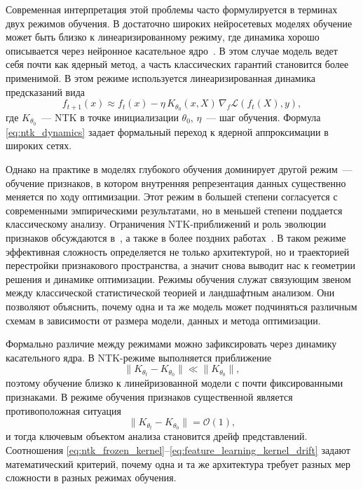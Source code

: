 Современная интерпретация этой проблемы часто формулируется в терминах двух режимов обучения.
В достаточно широких нейросетевых моделях обучение может быть близко к линеаризированному режиму, где динамика хорошо описывается через нейронное касательное ядро~\cite{jacot2018neural,adlam2020ntkhighdim,uniform2021ntk}.
В этом случае модель ведет себя почти как ядерный метод, а часть классических гарантий становится более применимой.
В этом режиме используется линеаризированная динамика предсказаний вида
\begin{equation}
f_{t+1}(x)\approx f_t(x)-\eta\,K_{\theta_0}(x,X)\,\nabla_f\mathcal L\!\left(f_t(X),y\right),
\label{eq:ntk_dynamics}
\end{equation}
где $K_{\theta_0}$~--- NTK в точке инициализации $\theta_0$, $\eta$~--- шаг обучения.
Формула \eqref{eq:ntk_dynamics} задает формальный переход к ядерной аппроксимации в широких сетях.

Однако на практике в моделях глубокого обучения доминирует другой режим~--- обучение признаков, в котором внутренняя репрезентация данных существенно меняется по ходу оптимизации.
Этот режим в большей степени согласуется с современными эмпирическими результатами, но в меньшей степени поддается классическому анализу. Ограничения NTK-приближений и роль эволюции признаков обсуждаются в~\cite{arora2019finegrained,featurevskernel2020}, а также в более поздних работах~\cite{leaveoneout2022,seleznova2022ntklimits}.
В таком режиме эффективная сложность определяется не только архитектурой, но и траекторией перестройки признакового пространства, а значит снова выводит нас к геометрии решения и динамике оптимизации.
Режимы обучения служат связующим звеном между классической статистической теорией и ландшафтным анализом.
Они позволяют объяснить, почему одна и та же модель может подчиняться различным схемам в зависимости от размера модели, данных и метода оптимизации.

Формально различие между режимами можно зафиксировать через динамику касательного ядра. В NTK-режиме выполняется приближение
\begin{equation}
\|K_{\theta_t}-K_{\theta_0}\| \ll \|K_{\theta_0}\|,
\label{eq:ntk_frozen_kernel}
\end{equation}
поэтому обучение близко к линейризованной модели с почти фиксированными признаками. В режиме обучения признаков существенной является противоположная ситуация
\begin{equation}
\|K_{\theta_t}-K_{\theta_0}\| = \mathcal O(1),
\label{eq:feature_learning_kernel_drift}
\end{equation}
и тогда ключевым объектом анализа становится дрейф представлений. Соотношения \eqref{eq:ntk_frozen_kernel}--\eqref{eq:feature_learning_kernel_drift} задают математический критерий, почему одна и та же архитектура требует разных мер сложности в разных режимах обучения.

